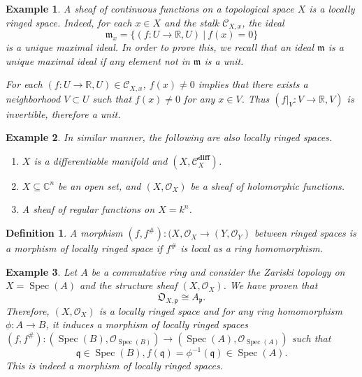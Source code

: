 \documentclass{article}
\newtheorem{definition}{Definition}[section]
\newtheorem{example}{Example}[section]
\numberwithin{equation}{section}
\DeclareMathOperator{\Spec}{Spec}
\begin{document}
\begin{example}
A sheaf of continuous functions on a topological space $X$ is a locally ringed space. Indeed, for each $x\in X$ and the stalk $\mathcal{C}_{X,x}$, the ideal 
\begin{equation*}
\mathfrak{m}_x = \{(f:U\to\mathbb{R},U)\:|\: f(x)=0\}
\end{equation*}
is a unique maximal ideal. In order to prove this, we recall that an ideal $\mathfrak{m}$ is a unique maximal ideal if any element not in $\mathfrak{m}$ is a unit.\\
\par For each $(f:U\to\mathbb{R},U)\in\mathcal{C}_{X,x}$, $f(x)\not=0$ implies that there exists a neighborhood $V\subset U$ such that $f(x)\not=0$ for any $x\in V$. Thus $(f|_V:V\to\mathbb{R},V)$ is invertible, therefore a unit.
\end{example}

\begin{example}
In similar manner, the following are also locally ringed spaces.
\begin{enumerate}
\item $X$ is a differentiable manifold and $(X,\mathcal{C}^{\mathbf{diff}}_X)$.
\item $X\subseteq \mathbb{C}^n$ be an open set, and $(X,\mathcal{O}_X)$ be a sheaf of holomorphic functions.
\item A sheaf of regular functions on $X=k^n$. 
\end{enumerate}
\end{example}

\begin{definition}
A morphism $(f,f^{\#}):(X,\mathcal{O}_X\to(Y,\mathcal{O}_Y)$ between ringed spaces is a morphism of locally ringed space if $f^{\#}$ is local as a ring homomorphism. 
\end{definition}

\begin{example}
Let $A$ be a commutative ring and consider the Zariski topology on $X=\Spec(A)$ and the structure sheaf $(X,\mathcal{O}_X)$. We have proven that 
\begin{equation*}
\mathfrak{O}_{X,\mathfrak{p}}\cong A_{\mathfrak{p}}.
\end{equation*}
Therefore, $(X,\mathcal{O}_X)$ is a locally ringed space and for any ring homomorphism $\phi:A\to B$, it induces a morphism of locally ringed spaces $(f,f^{\#}):(\Spec(B),\mathcal{O}_{\Spec(B)})\to(\Spec(A),\mathcal{O}_{\Spec(A)})$ such that
\begin{equation*}
\mathfrak{q}\in\Spec(B), f(\mathfrak{q}) = \phi^{-1}(\mathfrak{q})\in\Spec(A).
\end{equation*}
This is indeed a morphism of locally ringed spaces. 
\end{example}
\end{document}
